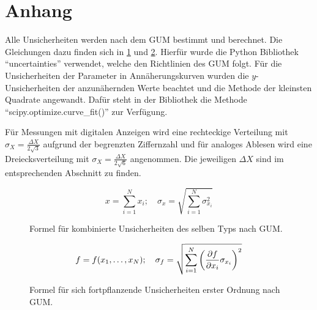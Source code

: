 \newpage
\appendix
\newpage
\section{Anhang}\label{sec:anhang}


Alle Unsicherheiten werden nach dem GUM bestimmt und berechnet.
Die Gleichungen dazu finden sich in \ref{fig:GUM_combine} und \ref{fig:GUM_formula}.
Hierfür wurde die Python Bibliothek \enquote{uncertainties} verwendet, welche den Richtlinien des GUM folgt.
Für die Unsicherheiten der Parameter in Annäherungskurven wurden die $y$-Unsicherheiten der anzunähernden Werte beachtet und die Methode der kleinsten Quadrate angewandt.
Dafür steht in der Bibliothek die Methode \enquote{scipy.optimize.curve\_fit()} zur Verfügung.

Für Messungen mit digitalen Anzeigen wird eine rechteckige Verteilung mit $\sigma_X = \frac{\Delta X}{2\sqrt{3}}$ aufgrund der begrenzten Ziffernzahl und für analoges Ablesen wird eine Dreiecksverteilung mit $\sigma_X = \frac{\Delta X}{2\sqrt{6}}$ angenommen.
Die jeweiligen $\Delta X$ sind im entsprechenden Abschnitt zu finden.

\begin{figure}[ht]
	\begin{equation*}
	x = \sum_{i=1}^{N} x_i
	;\quad
	\sigma_x = \sqrt{\sum_{i = 1}^{N} \sigma_{x_i}^2}
	\end{equation*}
	\caption{Formel für kombinierte Unsicherheiten des selben Typs nach GUM.}
	\label{fig:GUM_combine}
\end{figure}

\begin{figure}[ht]
	\begin{align*}
	f = f(x_1, \dots , x_N)
	;\quad
	\sigma_f = \sqrt{\sum_{i = 1}^{N}\left(\pdv{f}{x_i} \sigma_{x_i}\right) ^2}
	\end{align*}
	\caption{Formel für sich fortpflanzende Unsicherheiten erster Ordnung nach GUM.}
	\label{fig:GUM_formula}
\end{figure}

